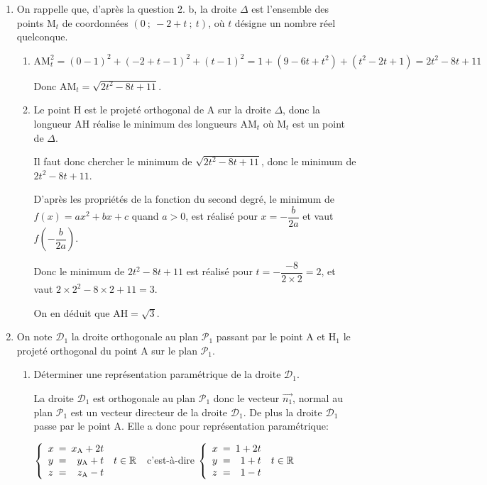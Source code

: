 \documentclass[10pt]{article}
\providecommand{\R}{\mathbb{R}}
\providecommand{\vect}[1]{\overrightarrow{#1}}
\providecommand{\ds}{\displaystyle}
\begin{document}
\begin{enumerate}[resume]
\item On rappelle que, d'après la question 2. b, la droite $\Delta$ est l'ensemble des points M$_t$ de coordonnées $(0~;~-2 + t~;~t)$, où $t$ désigne un nombre réel quelconque.

	\begin{enumerate}
		\item 
		
$\text{AM}_t^2 = (0-1)^2 + (-2+t-1)^2 +(t-1)^2 = 1 + \left (9 -6t +t^2\right ) +\left (t^2 -2t +1\right ) = 2t^2 -8t +11$

Donc $\text{AM}_t = \ds\sqrt{2t^2-8t+11}$.
		
		\item 
Le point H est le projeté orthogonal de A sur la droite $\Delta$, donc la longueur AH  réalise le minimum des longueurs AM$_t$ où M$_t$ est un point de $\Delta$.

Il faut donc chercher le minimum de $ \ds\sqrt{2t^2-8t+11}$, donc le minimum de $2t^2-8t+11$.

D'après les propriétés de la fonction du second degré, le minimum de $f(x)=ax^2+bx+c$ quand $a>0$, est réalisé pour $x=-\dfrac{b}{2a}$ et vaut $f\left (-\dfrac{b}{2a}\right )$.

Donc le minimum de $2t^2 - 8t + 11$ est réalisé pour $t=-\dfrac{-8}{2\times 2}=2$, et  vaut $2\times 2^2 -8\times 2 + 11 = 3$.

On en déduit que $\text{AH}=\ds\sqrt{3}$.
		
		
	\end{enumerate}
\item On note $\mathcal{D}_1$ la droite orthogonale au plan $\mathcal{P}_1$ passant par le point A et H$_1$ le projeté orthogonal du point A sur le plan $\mathcal{P}_1$.
	\begin{enumerate}
		\item Déterminer une représentation paramétrique de la droite $\mathcal{D}_1$.
		
La droite $\mathcal{D}_1$ est orthogonale au plan $\mathcal{P}_1$ donc le vecteur $\vect{n_1}$, normal au plan $\mathcal{P}_1$ est un vecteur directeur de la droite $\mathcal{D}_1$. De plus la droite $\mathcal{D}_1$ passe par le point A. Elle a donc pour représentation paramétrique:

$\left \{
\begin{array}{l !{=} r l}
x & x_{\text A} + 2t\\
y & y_{\text A} +t & t\in \R\\
z & z_{\text A} -t
\end{array}
\right .$
c'est-à-dire
$\left \{
\begin{array}{l !{=} r l}
x & 1 + 2t\\
y & 1 +t & t\in \R\\
z & 1 -t
\end{array}
\right .$		
		

\end{enumerate}
\end{enumerate}
\end{document}
